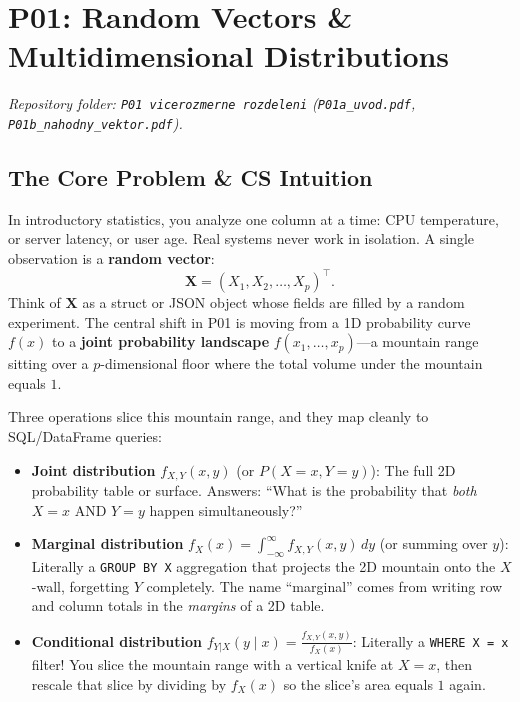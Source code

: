 \documentclass[11pt, a4paper]{article}
\begin{document}
\newpage

\section{P01: Random Vectors \& Multidimensional Distributions}
\emph{Repository folder: \texttt{P01 vicerozmerne rozdeleni} (\texttt{P01a\_uvod.pdf}, \texttt{P01b\_nahodny\_vektor.pdf}).}

\subsection{The Core Problem \& CS Intuition}
In introductory statistics, you analyze one column at a time: CPU temperature, or server latency, or user age. Real systems never work in isolation. A single observation is a \textbf{random vector}:
\[
    \mathbf{X} = (X_1, X_2, \dots, X_p)^\top.
\]
Think of $\mathbf{X}$ as a struct or JSON object whose fields are filled by a random experiment. The central shift in P01 is moving from a 1D probability curve $f(x)$ to a \textbf{joint probability landscape} $f(x_1, \dots, x_p)$---a mountain range sitting over a $p$-dimensional floor where the total volume under the mountain equals $1$.

Three operations slice this mountain range, and they map cleanly to SQL/DataFrame queries:
\begin{itemize}
    \item \textbf{Joint distribution} $f_{X,Y}(x, y)$ (or $P(X=x, Y=y)$): The full 2D probability table or surface. Answers: ``What is the probability that \emph{both} $X=x$ AND $Y=y$ happen simultaneously?''
    \item \textbf{Marginal distribution} $f_X(x) = \int_{-\infty}^{\infty} f_{X,Y}(x,y)\,dy$ (or summing over $y$): Literally a \texttt{GROUP BY X} aggregation that projects the 2D mountain onto the $X$-wall, forgetting $Y$ completely. The name ``marginal'' comes from writing row and column totals in the \emph{margins} of a 2D table.
    \item \textbf{Conditional distribution} $f_{Y|X}(y \mid x) = \frac{f_{X,Y}(x,y)}{f_X(x)}$: Literally a \texttt{WHERE X = x} filter! You slice the mountain range with a vertical knife at $X = x$, then rescale that slice by dividing by $f_X(x)$ so the slice's area equals $1$ again.
\end{itemize}
\end{document}
